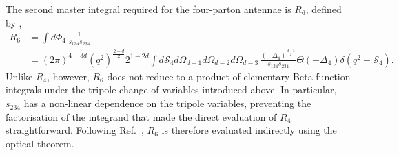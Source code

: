 The second master integral required for the four-parton antennae is $R_6$, defined by
\cite{GehrmannDeRidder0311276},
\begin{equation}
    \begin{split}
        R_6 &= \int d\Phi_4\,\frac1{s_{134}s_{234}}\\
            &= (2\pi)^{4-3d}\!\left(q^2\right)^{\frac{2-d}{2}}2^{1-2d}\int d\mathcal S_4d\Omega_{d-1}d\Omega_{d-2}d\Omega_{d-3}\,\frac{(-\Delta_4)^{\frac{d-5}{2}}}{s_{134}s_{234}}\Theta(-\Delta_4)\delta\!\left(q^2-\mathcal S_4\right).
    \end{split}
\end{equation}
Unlike $R_4$, however, $R_6$ does not reduce to a product of elementary Beta-function integrals
under the tripole change of variables introduced above. In particular, $s_{234}$ has a
non-linear dependence on the tripole variables, preventing the factorisation of the integrand
that made the direct evaluation of $R_4$ straightforward. Following
Ref.~\cite{GehrmannDeRidder0311276}, $R_6$ is therefore evaluated indirectly using the optical
theorem.

